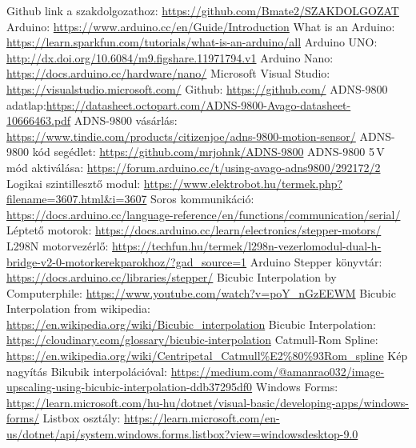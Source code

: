 \documentclass[]{thesis-ekf}
\theoremstyle{definition}
\theoremstyle{remark}
\begin{document}
	\begin{thebibliography}{9}
		 Github link a szakdolgozathoz: \url{https://github.com/Bmate2/SZAKDOLGOZAT}
		 Arduino: \url{https://www.arduino.cc/en/Guide/Introduction}
		 What is an Arduino: \url{https://learn.sparkfun.com/tutorials/what-is-an-arduino/all}
		 Arduino UNO: \url{http://dx.doi.org/10.6084/m9.figshare.11971794.v1}
		 Arduino Nano: \url{https://docs.arduino.cc/hardware/nano/}
		 Microsoft Visual Studio: \url{https://visualstudio.microsoft.com/}
		 Github: \url{https://github.com/}
		 ADNS-9800 adatlap:\url{https://datasheet.octopart.com/ADNS-9800-Avago-datasheet-10666463.pdf}
		 ADNS-9800 vásárlás: \url{https://www.tindie.com/products/citizenjoe/adns-9800-motion-sensor/}
		 ADNS-9800 kód segédlet: \url{https://github.com/mrjohnk/ADNS-9800}
		 ADNS-9800 5\,V mód aktiválása: \url{https://forum.arduino.cc/t/using-avago-adns9800/292172/2}
		 Logikai szintillesztő modul: \url{https://www.elektrobot.hu/termek.php?filename=3607.html&i=3607}
		 Soros kommunikáció: \url{https://docs.arduino.cc/language-reference/en/functions/communication/serial/}
		 Léptető motorok: \url{https://docs.arduino.cc/learn/electronics/stepper-motors/}
		 L298N motorvezérlő: \url{https://techfun.hu/termek/l298n-vezerlomodul-dual-h-bridge-v2-0-motorkerekparokhoz/?gad_source=1}
		 Arduino Stepper könyvtár: \url{https://docs.arduino.cc/libraries/stepper/}
		 Bicubic Interpolation by Computerphile: \url{https://www.youtube.com/watch?v=poY_nGzEEWM}
		 Bicubic Interpolation from wikipedia: \url{https://en.wikipedia.org/wiki/Bicubic_interpolation}
		 Bicubic Interpolation: \url{https://cloudinary.com/glossary/bicubic-interpolation}
		 Catmull-Rom Spline: \url{https://en.wikipedia.org/wiki/Centripetal_Catmull%E2%80%93Rom_spline}
		 Kép nagyítás Bikubik interpolációval: \url{https://medium.com/@amanrao032/image-upscaling-using-bicubic-interpolation-ddb37295df0}
		 Windows Forms: \url{https://learn.microsoft.com/hu-hu/dotnet/visual-basic/developing-apps/windows-forms/}
		 Listbox osztály: \url{https://learn.microsoft.com/en-us/dotnet/api/system.windows.forms.listbox?view=windowsdesktop-9.0}

\end{thebibliography}
\end{document}
